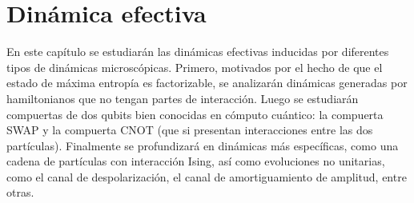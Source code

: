 \chapter{Dinámica efectiva}\label{sec:chapter3}


En este capítulo se estudiarán las dinámicas efectivas inducidas por diferentes tipos de dinámicas microscópicas. Primero, motivados por el hecho de que el estado de máxima entropía es factorizable, se analizarán dinámicas generadas por hamiltonianos que no tengan partes de interacción. Luego se estudiarán compuertas de dos qubits bien conocidas en cómputo cuántico: la compuerta SWAP y la compuerta CNOT (que si presentan interacciones entre las dos partículas). Finalmente se profundizará en dinámicas más específicas, como una cadena de partículas con interacción Ising, así como evoluciones no unitarias, como el canal de despolarización, el canal de amortiguamiento de amplitud, entre otras.




\newpage